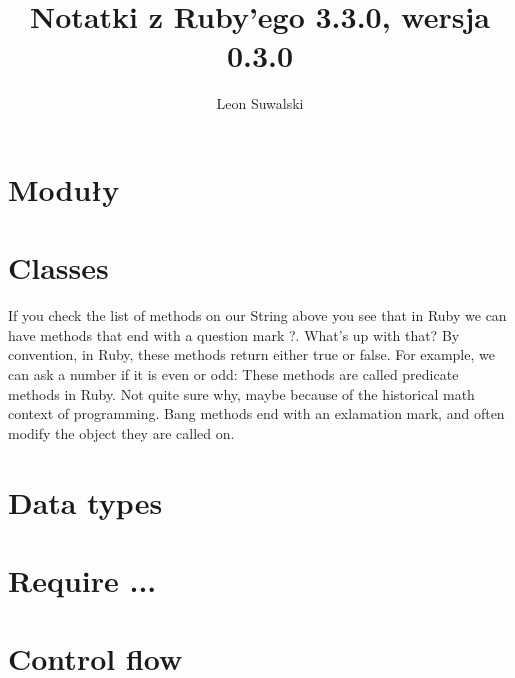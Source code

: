 \documentclass{a5charun}
\title{Notatki z Ruby'ego 3.3.0, wersja 0.3.0}
\author{Leon Suwalski}
\begin{document}
\maketitle

\section{Moduły}


\section{Classes}





\newpage

If you check the list of methods on our String above you see that in Ruby we can have methods that end with a question mark ?. What’s up with that?
By convention, in Ruby, these methods return either true or false. For example, we can ask a number if it is even or odd:
These methods are called predicate methods in Ruby. Not quite sure why, maybe because of the historical math context of programming.
Bang methods end with an exlamation mark, and often modify the object they are called on. 


\section{Data types}







\section{Require ...}


\section{Control flow}


\end{document}
